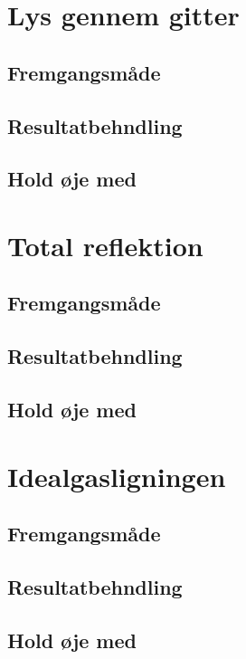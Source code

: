 \section{Lys gennem gitter}
\subsection{Fremgangsmåde}

\subsection{Resultatbehndling}

\subsection{Hold øje med}

\section{Total reflektion}
\subsection{Fremgangsmåde}

\subsection{Resultatbehndling}

\subsection{Hold øje med}

\section{Idealgasligningen}
\subsection{Fremgangsmåde}

\subsection{Resultatbehndling}

\subsection{Hold øje med}

